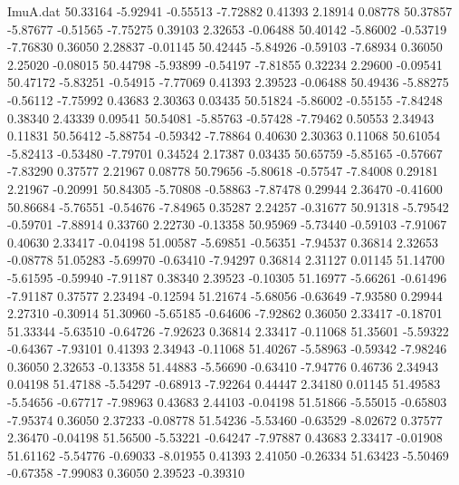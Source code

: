 \begin{filecontents}{ImuA.dat}
  50.33164   -5.92941   -0.55513   -7.72882    0.41393    2.18914    0.08778
  50.37857   -5.87677   -0.51565   -7.75275    0.39103    2.32653   -0.06488
  50.40142   -5.86002   -0.53719   -7.76830    0.36050    2.28837   -0.01145
  50.42445   -5.84926   -0.59103   -7.68934    0.36050    2.25020   -0.08015
  50.44798   -5.93899   -0.54197   -7.81855    0.32234    2.29600   -0.09541
  50.47172   -5.83251   -0.54915   -7.77069    0.41393    2.39523   -0.06488
  50.49436   -5.88275   -0.56112   -7.75992    0.43683    2.30363    0.03435
  50.51824   -5.86002   -0.55155   -7.84248    0.38340    2.43339    0.09541
  50.54081   -5.85763   -0.57428   -7.79462    0.50553    2.34943    0.11831
  50.56412   -5.88754   -0.59342   -7.78864    0.40630    2.30363    0.11068
  50.61054   -5.82413   -0.53480   -7.79701    0.34524    2.17387    0.03435
  50.65759   -5.85165   -0.57667   -7.83290    0.37577    2.21967    0.08778
  50.79656   -5.80618   -0.57547   -7.84008    0.29181    2.21967   -0.20991
  50.84305   -5.70808   -0.58863   -7.87478    0.29944    2.36470   -0.41600
  50.86684   -5.76551   -0.54676   -7.84965    0.35287    2.24257   -0.31677
  50.91318   -5.79542   -0.59701   -7.88914    0.33760    2.22730   -0.13358
  50.95969   -5.73440   -0.59103   -7.91067    0.40630    2.33417   -0.04198
  51.00587   -5.69851   -0.56351   -7.94537    0.36814    2.32653   -0.08778
  51.05283   -5.69970   -0.63410   -7.94297    0.36814    2.31127    0.01145
  51.14700   -5.61595   -0.59940   -7.91187    0.38340    2.39523   -0.10305
  51.16977   -5.66261   -0.61496   -7.91187    0.37577    2.23494   -0.12594
  51.21674   -5.68056   -0.63649   -7.93580    0.29944    2.27310   -0.30914
  51.30960   -5.65185   -0.64606   -7.92862    0.36050    2.33417   -0.18701
  51.33344   -5.63510   -0.64726   -7.92623    0.36814    2.33417   -0.11068
  51.35601   -5.59322   -0.64367   -7.93101    0.41393    2.34943   -0.11068
  51.40267   -5.58963   -0.59342   -7.98246    0.36050    2.32653   -0.13358
  51.44883   -5.56690   -0.63410   -7.94776    0.46736    2.34943    0.04198
  51.47188   -5.54297   -0.68913   -7.92264    0.44447    2.34180    0.01145
  51.49583   -5.54656   -0.67717   -7.98963    0.43683    2.44103   -0.04198
  51.51866   -5.55015   -0.65803   -7.95374    0.36050    2.37233   -0.08778
  51.54236   -5.53460   -0.63529   -8.02672    0.37577    2.36470   -0.04198
  51.56500   -5.53221   -0.64247   -7.97887    0.43683    2.33417   -0.01908
  51.61162   -5.54776   -0.69033   -8.01955    0.41393    2.41050   -0.26334
  51.63423   -5.50469   -0.67358   -7.99083    0.36050    2.39523   -0.39310

\end{filecontents}
